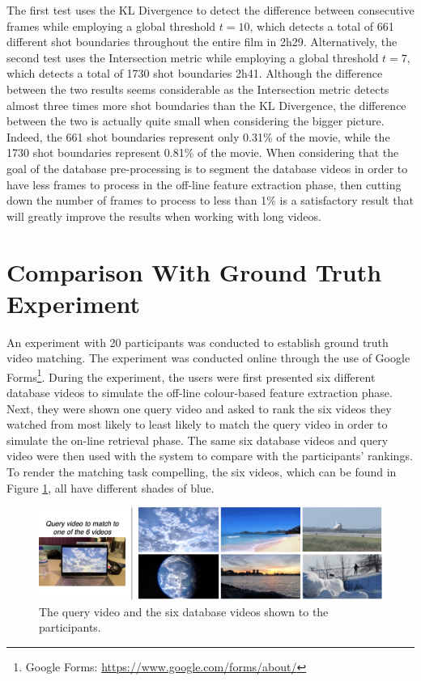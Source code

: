 The first test uses the KL Divergence to detect the difference between consecutive frames while employing a global threshold $t=10$, which detects a total of 661 different shot boundaries throughout the entire film in 2h29. Alternatively, the second test uses the Intersection metric while employing a global threshold $t=7$, which detects a total of 1730 shot boundaries 2h41. Although the difference between the two results seems considerable as the Intersection metric detects almost three times more shot boundaries than the KL Divergence, the difference between the two is actually quite small when considering the bigger picture. Indeed, the 661 shot boundaries represent only 0.31\% of the movie, while the 1730 shot boundaries represent 0.81\% of the movie. When considering that the goal of the database pre-processing is to segment the database videos in order to have less frames to process in the off-line feature extraction phase, then cutting down the number of frames to process to less than 1\% is a satisfactory result that will greatly improve the results when working with long videos.\\


\section{Comparison With Ground Truth Experiment}

An experiment with 20 participants was conducted to establish ground truth video matching. The experiment was conducted online through the use of Google Forms\footnote{Google Forms: \url{https://www.google.com/forms/about/}}. During the experiment, the users were first presented six different database videos to simulate the off-line colour-based feature extraction phase. Next, they were shown one query video and asked to rank the six videos they watched from most likely to least likely to match the query video in order to simulate the on-line retrieval phase. The same six database videos and query video were then used with the system to compare with the participants' rankings. To render the matching task compelling, the six videos, which can be found in Figure \ref{fig:evaluation-online_experiment_dbvideos}, all have different shades of blue.

\begin{figure}[h] 
\centerline{\includegraphics[width=\textwidth]{figures/evaluation/online_experiment_dbvideos.png}}
\caption{\label{fig:evaluation-online_experiment_dbvideos}The query video and the six database videos shown to the participants.}
\end{figure}

